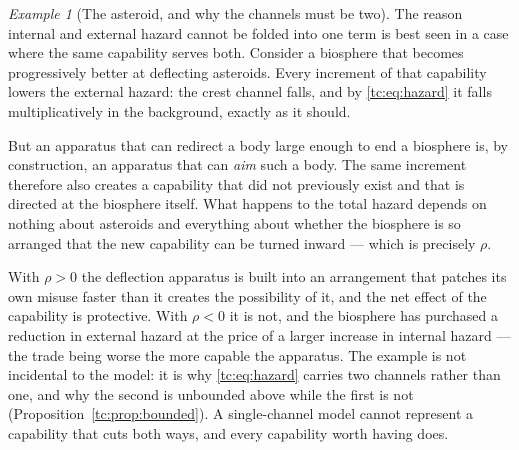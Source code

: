 \documentclass[11pt]{article}
\numberwithin{equation}{section}
\theoremstyle{plain}
\theoremstyle{definition}
\theoremstyle{remark}
\newtheorem{example}[theorem]{Example}
\begin{document}
\begin{example}[The asteroid, and why the channels must be two]
\label{gr1:ex:asteroid}
The reason internal and external hazard cannot be folded into one term
is best seen in a case where the same capability serves both. Consider a
biosphere that becomes progressively better at deflecting asteroids.
Every increment of that capability lowers the external hazard: the
crest channel falls, and by \eqref{tc:eq:hazard} it falls
multiplicatively in the background, exactly as it should.

But an apparatus that can redirect a body large enough to end a
biosphere is, by construction, an apparatus that can \emph{aim} such a
body. The same increment therefore also creates a capability that did
not previously exist and that is directed at the biosphere itself. What
happens to the total hazard depends on nothing about asteroids and
everything about whether the biosphere is so arranged that the new
capability can be turned inward --- which is precisely $\rho$.

With $\rho>0$ the deflection apparatus is built into an arrangement that
patches its own misuse faster than it creates the possibility of it, and
the net effect of the capability is protective. With $\rho<0$ it is not,
and the biosphere has purchased a reduction in external hazard at the
price of a larger increase in internal hazard --- the trade being worse
the more capable the apparatus. The example is not incidental to the
model: it is why \eqref{tc:eq:hazard} carries two channels rather than
one, and why the second is unbounded above while the first is not
(Proposition~\ref{tc:prop:bounded}). A single-channel model cannot
represent a capability that cuts both ways, and every capability worth
having does.
\end{example}
\end{document}
